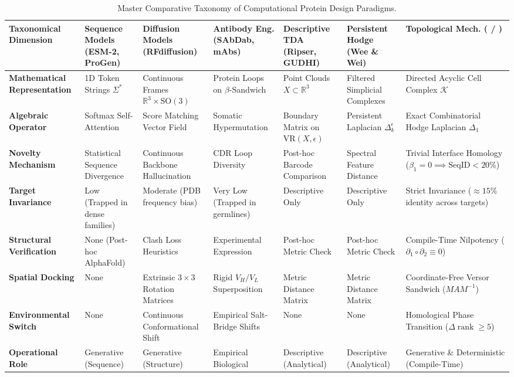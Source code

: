\begin{table}[p]
\centering
\scriptsize
\renewcommand{\arraystretch}{1.35}
\begin{tabular}{@{} p{2.2cm} p{1.8cm} p{1.8cm} p{1.8cm} p{1.8cm} p{1.8cm} p{2.2cm} @{}}
\toprule
\textbf{Taxonomical Dimension} & \textbf{Sequence Models (ESM-2, ProGen)} & \textbf{Diffusion Models (RFdiffusion)} & \textbf{Antibody Eng. (SAbDab, mAbs)} & \textbf{Descriptive TDA (Ripser, GUDHI)} & \textbf{Persistent Hodge (Wee \& Wei)} & \textbf{Topological Mech. (\ToposLang{} / \PLQ{})} \\
\midrule
\textbf{Mathematical Representation} & 1D Token Strings $\Sigma^*$ & Continuous Frames $\mathbb{R}^3 \times \mathrm{SO}(3)$ & Protein Loops on $\beta$-Sandwich & Point Clouds $X \subset \mathbb{R}^3$ & Filtered Simplicial Complexes & Directed Acyclic Cell Complex $\mathcal{K}$ \\
\textbf{Algebraic Operator} & Softmax Self-Attention & Score Matching Vector Field & Somatic Hypermutation & Boundary Matrix on $\mathrm{VR}(X, \epsilon)$ & Persistent Laplacian $\Delta_k^\epsilon$ & Exact Combinatorial Hodge Laplacian $\Delta_1$ \\
\textbf{Novelty Mechanism} & Statistical Sequence Divergence & Continuous Backbone Hallucination & CDR Loop Diversity & Post-hoc Barcode Comparison & Spectral Feature Distance & Trivial Interface Homology ($\beta_1 = 0 \implies \text{SeqID} < 20\%$) \\
\textbf{Target Invariance} & Low (Trapped in dense families) & Moderate (PDB frequency bias) & Very Low (Trapped in germlines) & Descriptive Only & Descriptive Only & Strict Invariance ($\approx 15\%$ identity across targets) \\
\textbf{Structural Verification} & None (Post-hoc AlphaFold) & Clash Loss Heuristics & Experimental Expression & Post-hoc Metric Check & Post-hoc Metric Check & Compile-Time Nilpotency ($\partial_1 \circ \partial_2 \equiv 0$) \\
\textbf{Spatial Docking} & None & Extrinsic $3 \times 3$ Rotation Matrices & Rigid $V_H/V_L$ Superposition & Metric Distance Matrix & Metric Distance Matrix & Coordinate-Free Versor Sandwich ($M A M^{-1}$) \\
\textbf{Environmental Switch} & None & Continuous Conformational Shift & Empirical Salt-Bridge Shifts & None & None & Homological Phase Transition ($\Delta\operatorname{rank} \ge 5$) \\
\textbf{Operational Role} & Generative (Sequence) & Generative (Structure) & Empirical Biological & Descriptive (Analytical) & Descriptive (Analytical) & Generative \& Deterministic (Compile-Time) \\
\bottomrule
\end{tabular}
\caption{Master Comparative Taxonomy of Computational Protein Design Paradigms.}
\label{tab:master_taxonomy}
\end{table}

